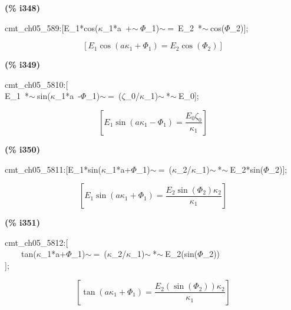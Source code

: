 \documentclass[fleqn]{article}
\begin{document}
\noindent
\begin{minipage}[t]{4.000000em}\color{red}\bfseries
(\% i348)	
\end{minipage}
\begin{minipage}[t]{\textwidth}\color{blue}
cmt\_ch05\_589:[E\_1*cos(\ensuremath{\kappa}\_1*a\ +\ensuremath{\sim\ }\ensuremath{\Phi}\_1)\ensuremath{\sim\ }=\ E\_2\ *\ensuremath{\sim\ }cos(\ensuremath{\Phi}\_2)];
\end{minipage}
\[\displaystyle \tag{\% o348} 
\left[ {E_1} \cos{\left( a {{\kappa }_1}+{{\Phi }_1}\right) }={E_2} \cos{\left( {{\Phi }_2}\right) }\right] \mbox{}
\]


\noindent
\begin{minipage}[t]{4.000000em}\color{red}\bfseries
(\% i349)	
\end{minipage}
\begin{minipage}[t]{\textwidth}\color{blue}
cmt\_ch05\_5810:[\\
E\_1\ *\ensuremath{\sim\ }sin(\ensuremath{\kappa}\_1*a\ -\ensuremath{\Phi}\_1)\ensuremath{\sim\ }=\ (\ensuremath{\zeta}\_0/\ensuremath{\kappa}\_1)\ensuremath{\sim\ }*\ensuremath{\sim\ }E\_0];
\end{minipage}
\[\displaystyle \tag{\% o349} 
\left[ {E_1} \sin{\left( a {{\kappa }_1}-{{\Phi }_1}\right) }=\frac{{E_0} {{\zeta }_0}}{{{\kappa }_1}}\right] \mbox{}
\]


\noindent
\begin{minipage}[t]{4.000000em}\color{red}\bfseries
(\% i350)	
\end{minipage}
\begin{minipage}[t]{\textwidth}\color{blue}
cmt\_ch05\_5811:[E\_1*sin(\ensuremath{\kappa}\_1*a+\ensuremath{\Phi}\_1)\ensuremath{\sim\ }=\ (\ensuremath{\kappa}\_2/\ensuremath{\kappa}\_1)\ensuremath{\sim\ }*\ensuremath{\sim\ }E\_2*sin(\ensuremath{\Phi}\_2)];
\end{minipage}
\[\displaystyle \tag{\% o350} 
\left[ {E_1} \sin{\left( a {{\kappa }_1}+{{\Phi }_1}\right) }=\frac{{E_2} \sin{\left( {{\Phi }_2}\right) } {{\kappa }_2}}{{{\kappa }_1}}\right] \mbox{}
\]


\noindent
\begin{minipage}[t]{4.000000em}\color{red}\bfseries
(\% i351)	
\end{minipage}
\begin{minipage}[t]{\textwidth}\color{blue}
cmt\_ch05\_5812:[\\
\ \ \ \ tan(\ensuremath{\kappa}\_1*a+\ensuremath{\Phi}\_1)\ensuremath{\sim\ }=\ (\ensuremath{\kappa}\_2/\ensuremath{\kappa}\_1)\ensuremath{\sim\ }*\ensuremath{\sim\ }E\_2(sin(\ensuremath{\Phi}\_2))\\
];
\end{minipage}
\[\displaystyle \tag{\% o351} 
\left[ \tan{\left( a {{\kappa }_1}+{{\Phi }_1}\right) }=\frac{{E_2}\left( \sin{\left( {{\Phi }_2}\right) }\right)  {{\kappa }_2}}{{{\kappa }_1}}\right] \mbox{}
\]
\end{document}
